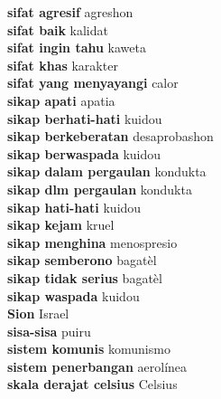 \textbf{ sifat agresif  } agreshon \\
\textbf{ sifat baik  } kalidat \\
\textbf{ sifat ingin tahu  } kaweta \\
\textbf{ sifat khas  } karakter \\
\textbf{ sifat yang menyayangi  } calor \\
\textbf{ sikap apati  } apatia \\
\textbf{ sikap berhati-hati  } kuidou \\
\textbf{ sikap berkeberatan  } desaprobashon \\
\textbf{ sikap berwaspada  } kuidou \\
\textbf{ sikap dalam pergaulan  } kondukta \\
\textbf{ sikap dlm pergaulan  } kondukta \\
\textbf{ sikap hati-hati  } kuidou \\
\textbf{ sikap kejam  } kruel \\
\textbf{ sikap menghina  } menospresio \\
\textbf{ sikap semberono  } bagatèl \\
\textbf{ sikap tidak serius  } bagatèl \\
\textbf{ sikap waspada  } kuidou \\
\textbf{ Sion  } Israel \\
\textbf{ sisa-sisa  } puiru \\
\textbf{ sistem komunis  } komunismo \\
\textbf{ sistem penerbangan  } aerolínea \\
\textbf{ skala derajat celsius  } Celsius \\

